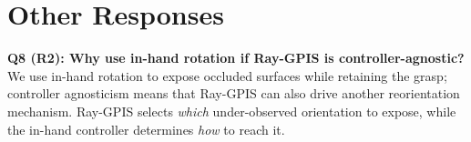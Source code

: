 \documentclass[conference]{IEEEtran}
\begin{document}
\section*{Other Responses}
\textbf{Q8 (R2): Why use in-hand rotation if Ray-GPIS is
controller-agnostic?} We use in-hand rotation to expose occluded surfaces while
retaining the grasp; controller agnosticism means that Ray-GPIS can also drive
another reorientation mechanism. Ray-GPIS selects \emph{which} under-observed
orientation to expose, while the in-hand controller determines \emph{how} to
reach it.


{\footnotesize }
\end{document}
